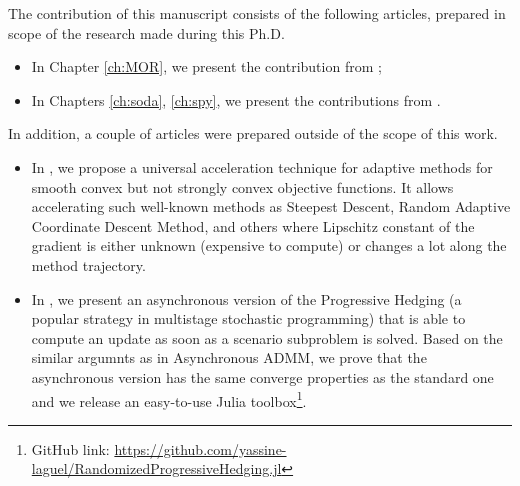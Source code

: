 
The contribution of this manuscript consists of the following articles, prepared in scope of the research made during this Ph.D.
\begin{itemize}
    \item[] In Chapter \ref{ch:MOR}, we present the contribution from \cite{grishchenko2020proximal};
    \item[] In Chapters \ref{ch:soda}, \ref{ch:spy}, we present the contributions from \cite{grishchenko2018asynchronous}.
\end{itemize}

In addition, a couple of articles were prepared outside of the scope of this work.
\begin{itemize}
    \item[] In \cite{ivanova2019adaptive}, we propose a universal acceleration technique for adaptive methods for smooth convex but not strongly convex objective functions. It allows accelerating such well-known methods as Steepest Descent, Random Adaptive Coordinate Descent Method, and others where Lipschitz constant of the gradient is either unknown (expensive to compute) or changes a lot along the method trajectory.
    \item[] In \cite{bareilles2020solving}, we present an asynchronous version of the Progressive Hedging (a popular strategy in multistage stochastic programming) that is able to compute an update as soon as a scenario subproblem is solved. Based on the similar argumnts as in Asynchronous ADMM, we prove that the asynchronous version has the same converge properties as the standard one and we release an easy-to-use Julia toolbox\footnote{GitHub link: \href{https://github.com/yassine-laguel/RandomizedProgressiveHedging.jl}{https://github.com/yassine-laguel/RandomizedProgressiveHedging.jl}}.
\end{itemize}
